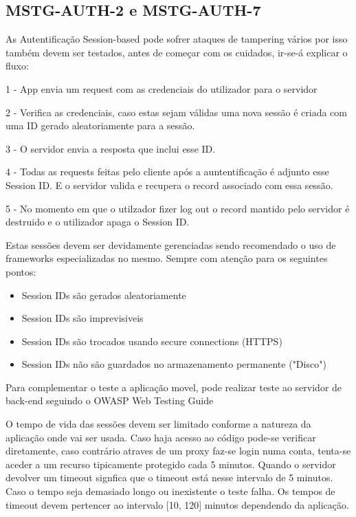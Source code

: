 \subsection{MSTG-AUTH-2 e MSTG-AUTH-7}

As Autentificação Session-based pode sofrer ataques de tampering vários por isso também devem ser testados, antes de começar com os cuidados, ir-se-á explicar o fluxo:

1 - App envia um request com as credenciais do utilizador para o servidor

2 - Verifica as credenciais, caso estas sejam válidas uma nova sessão é criada com uma ID gerado aleatoriamente para a sessão.

3 - O servidor envia a resposta que inclui esse ID.

4 - Todas as requests feitas pelo cliente após a auntentificação é adjunto esse Session ID. E o servidor valida e recupera o record associado com essa sessão.

5 - No momento em que o utilzador fizer log out  o record mantido pelo servidor é destruido e o utilizador apaga o Session ID.

Estas sessões devem ser devidamente gerenciadas sendo recomendado o uso de frameworks especializadas no mesmo. Sempre com atenção para os seguintes pontos:

\begin{itemize}

\item Session IDs são gerados aleatoriamente
\item Session IDs são imprevisiveis
\item Session IDs são trocados usando secure connections (HTTPS)
\item Session IDs não são guardados no armazenamento permanente ("Disco")

\end{itemize}

Para complementar o teste a aplicação movel, pode realizar teste ao servidor de back-end seguindo o OWASP Web Testing Guide \cite{ref_intro11} \cite{ref_intro12}

O tempo de vida das sessões devem ser limitado conforme a natureza da aplicação onde vai ser usada. Caso haja acesso ao código pode-se verificar diretamente, caso contrário atraves de um proxy faz-se login numa conta, tenta-se aceder a um recurso tipicamente protegido cada 5 minutos. Quando o servidor devolver um timeout signfica que o timeout está nesse intervalo de 5 minutos. Caso o tempo seja demasiado longo ou inexistente o teste falha. Os tempos de timeout devem pertencer ao intervalo [10, 120] minutos dependendo da aplicação.

